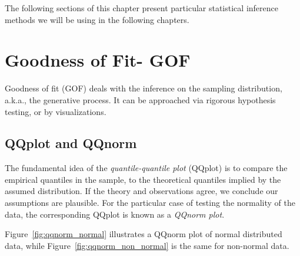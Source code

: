 \documentclass[12pt,a4paper]{report}
\begin{document}
The following sections of this chapter present particular statistical inference methods we will be using in the following chapters.


\section{Goodness of Fit- GOF}
Goodness of fit (GOF) deals with the inference on the sampling distribution, a.k.a., the generative process.
It can be approached via rigorous hypothesis testing, or by visualizations.

\subsection{QQplot and QQnorm}
The fundamental idea of the \emph{quantile-quantile plot} (QQplot) is to compare the empirical quantiles in the sample, to the theoretical quantiles implied by the assumed distribution. If the theory and observations agree, we conclude our assumptions are plausible. 
For the particular case of testing the normality of the data, the corresponding QQplot is known as a \emph{QQnorm plot}.

Figure~\ref{fig:qqnorm_normal} illustrates a QQnorm plot of normal distributed data, while Figure~\ref{fig:qqnorm_non_normal} is the same for non-normal data.
\end{document}
